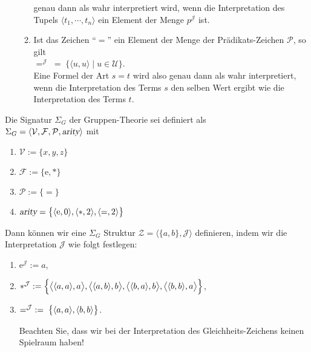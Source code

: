 \begin{Definition}[Struktur]
\begin{enumerate}
\begin{enumerate}
              genau dann als wahr interpretiert wird, wenn die Interpretation des Tupels
              $\langle t_1, \cdots, t_n \rangle$ ein Element der Menge $p^\mathcal{J}$ ist.
        \item Ist das Zeichen ``$=$'' ein Element der Menge der Prädikats-Zeichen $\mathcal{P}$, so gilt
              \\[0.2cm]
              \hspace*{1.3cm}  
              $=^\mathcal{J} \;=\; \bigl\{ \langle u, u \rangle \mid u \in \mathcal{U} \bigr\}$.
              \\[0.2cm]
              Eine Formel der Art $s = t$ wird also genau dann als wahr interpretiert, 
              wenn die Interpretation des Terms $s$ den selben Wert ergibt wie die Interpretation des Terms $t$.
              \eox
        \end{enumerate}
    \end{enumerate}
\end{Definition}

\example
Die Signatur  $\Sigma_G$ der Gruppen-Theorie sei definiert als \\[0.2cm]
\hspace*{1.3cm} $\Sigma_G = \langle \mathcal{V}, \mathcal{F}, \mathcal{P},\textsl{arity}\rangle$ 
\quad mit
\begin{enumerate}
\item $\mathcal{V} := \{ x, y, z \}$
\item $\mathcal{F} := \{ \mathrm{e}, * \}$
\item $\mathcal{P} := \{ \mathtt{=} \}$
\item $\textsl{arity} = \bigl\{ \pair(\mathrm{e},0), \pair(*,2), \pair(\mathtt{=},2)\bigr\}$
\end{enumerate}
Dann können wir eine $\Sigma_G$ Struktur $\mathcal{Z} = \langle \{a,
b\},\mathcal{J}\rangle$ definieren, 
indem wir die Interpretation $\mathcal{J}$ 
wie folgt festlegen:
\begin{enumerate}
\item $\mathrm{e}^\mathcal{J} := a$,
\item $*^\mathcal{J} := \Bigl\{ \bigl\langle\pair(a,a), a\bigr\rangle,
                                   \bigl\langle\pair(a,b), b\bigr\rangle,
                                   \bigl\langle\pair(b,a), b\bigr\rangle,
                                   \bigl\langle\pair(b,b), a\bigr\rangle \Bigr\}$,
\item $=^\mathcal{J} \;:=\; \bigl\{ \pair(a,a), \pair(b,b) \bigr\}$.
                                 
      Beachten Sie, dass wir bei der Interpretation des Gleichheits-Zeichens 
      keinen Spielraum haben! \eox
\end{enumerate}

